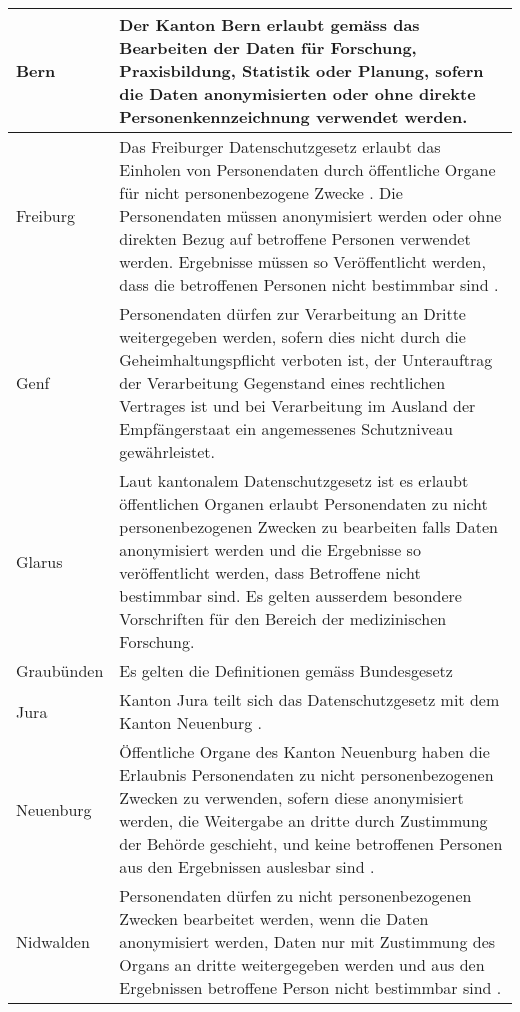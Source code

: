 \begin{longtable}{| p{} | p{}|}
		\hline
    Bern & Der Kanton Bern erlaubt gemäss \parencite[§§ 15 Abs. 1]{DSSGBERN} das Bearbeiten der Daten für Forschung, Praxisbildung, Statistik oder Planung, sofern die Daten anonymisierten oder ohne direkte Personenkennzeichnung verwendet werden. \\
		\hline
		Freiburg & Das Freiburger Datenschutzgesetz erlaubt das Einholen von Personendaten durch öffentliche Organe für nicht personenbezogene Zwecke \parencite[§§ 14 Abs. 1]{DSSGFR}. Die Personendaten müssen anonymisiert werden oder ohne direkten Bezug auf betroffene Personen verwendet werden. Ergebnisse müssen so Veröffentlicht werden, dass die betroffenen Personen nicht bestimmbar sind \parencite[§ 16 Abs. 1-2]{DSSGFR}.  \\
		\hline
    Genf & Personendaten dürfen zur Verarbeitung an Dritte weitergegeben werden, sofern dies nicht durch die Geheimhaltungspflicht verboten ist, der Unterauftrag der Verarbeitung Gegenstand eines rechtlichen Vertrages ist und bei Verarbeitung im Ausland der Empfängerstaat ein angemessenes Schutzniveau gewährleistet.     \parencite[§§ 13A Abs. 1-5]{DSSGGE} \\
		\hline
		Glarus & Laut kantonalem Datenschutzgesetz ist es erlaubt öffentlichen Organen erlaubt Personendaten zu nicht personenbezogenen Zwecken zu bearbeiten falls Daten anonymisiert werden und die Ergebnisse so veröffentlicht werden, dass Betroffene nicht bestimmbar sind. Es gelten ausserdem besondere Vorschriften für den Bereich der medizinischen Forschung.  \parencite[§§ 11 Abs 1-2]{DSSGGL} \\
		\hline
		Graubünden & Es gelten die Definitionen gemäss Bundesgesetz \parencite[§§ 2 Abs. 2-3]{DSSGGR}  \\
		\hline
		Jura & Kanton Jura teilt sich das Datenschutzgesetz mit dem Kanton Neuenburg \parencite[S. 1 Abs. 2]{JURAAbkommenNE}. \\
		\hline
		Neuenburg & Öffentliche Organe des Kanton Neuenburg haben die Erlaubnis Personendaten zu nicht personenbezogenen Zwecken zu verwenden, sofern diese anonymisiert werden, die Weitergabe an dritte durch Zustimmung der Behörde geschieht, und keine betroffenen Personen aus den Ergebnissen auslesbar sind \parencite[§§ 25 Abs. 1]{DSSGNE}. \\
		\hline
		Nidwalden & Personendaten dürfen zu nicht personenbezogenen Zwecken bearbeitet werden, wenn die Daten anonymisiert werden, Daten nur mit Zustimmung des Organs an dritte weitergegeben werden und aus den Ergebnissen betroffene Person nicht bestimmbar sind \parencite[§§ 16 Abs 1-2]{DSSGNW}. \\

\end{longtable}
